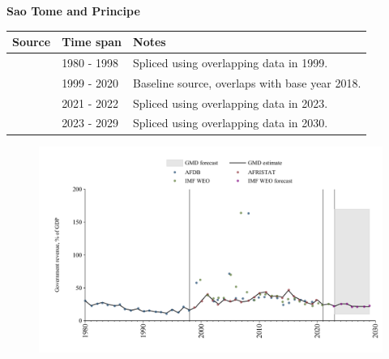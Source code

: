 \documentclass[12pt,a4paper,landscape]{article}
\begin{document}
\begin{adjustbox}{max totalsize={\paperwidth}{\paperheight},center}
\begin{minipage}[t][\textheight][t]{\textwidth}
\vspace*{0.5cm}
{}
\begin{center}
{\Large\bfseries Sao Tome and Principe}
\end{center}
\vspace{0.5cm}
\begin{table}[H]
\centering
\small
\begin{tabular}{|l|l|l|}
\hline
\textbf{Source} & \textbf{Time span} & \textbf{Notes} \\
\hline
\rowcolor{white}\cite{AFDB}& 1980 - 1998 &Spliced using overlapping data in 1999.\\
\rowcolor{lightgray}\cite{AFRISTAT}& 1999 - 2020 &Baseline source, overlaps with base year 2018.\\
\rowcolor{white}\cite{IMF_WEO}& 2021 - 2022 &Spliced using overlapping data in 2023.\\
\rowcolor{lightgray}\cite{IMF_WEO_forecast}& 2023 - 2029 &Spliced using overlapping data in 2030.\\
\hline
\end{tabular}
\end{table}
\begin{figure}[H]
\centering
\includegraphics[width=\textwidth,height=0.6\textheight,keepaspectratio]{graphs/STP_govrev_GDP.pdf}
\end{figure}
\end{minipage}
\end{adjustbox}
\end{document}
